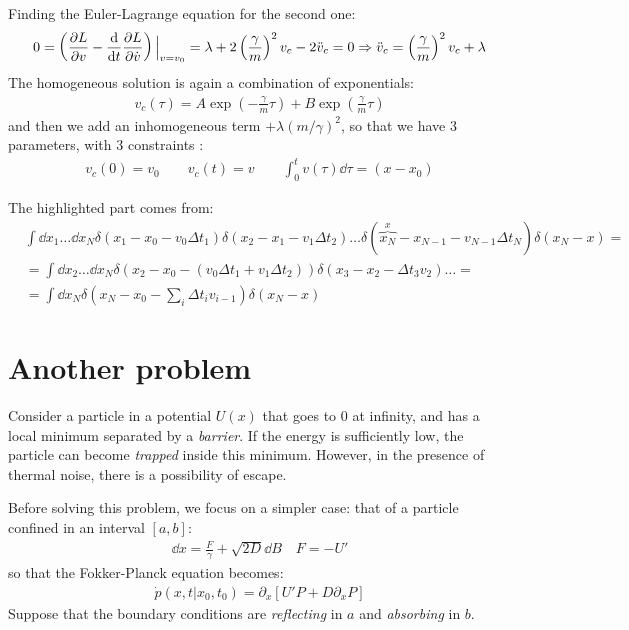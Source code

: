 \documentclass[../template.tex]{subfiles}
\begin{document}
Finding the Euler-Lagrange equation for the second one:
\begin{align*}
    0 = \left(\pdv{L}{v} - \dv{t} \pdv{L}{\dot{v}}\right)\Big|_{v = v_0} = \lambda + 2 \left(\frac{\gamma}{m} \right)^2 v_c - 2 \ddot{v}_c = 0 \Rightarrow \ddot{v}_c = \left(\frac{\gamma}{m} \right)^2 v_c + \lambda
\end{align*}
The homogeneous solution is again a combination of exponentials:
\begin{align*}
    v_c(\tau) = A \exp\left(-\frac{\gamma}{m}\tau \right) + B \exp\left(\frac{\gamma}{m} \tau \right)
\end{align*}
and then we add an inhomogeneous term $+\lambda (m/\gamma)^2$, so that we have $3$ parameters, with $3$ constraints :
\begin{align*}
    v_c(0) = v_0 \qquad v_c(t) = v\qquad \int_0^t v(\tau)\dd{\tau} = (x-x_0)
\end{align*}  

\begin{expl}
    The highlighted part comes from:
    \begin{align*}
        &\int \dd{x_1}\dots \dd{x_N} \delta(x_1 - x_0 - v_0 \Delta t_1) \delta(x_2 - x_1 - v_1 \Delta t_2) \dots \delta(\overbrace{x_N}^{x} - x_{N-1} - v_{N-1} \Delta t_N  ) \delta(x_N - x) =\\
        &= \int \dd{x}_2 \dots \dd{x}_N \delta(x_2 - x_0 - (v_0 \Delta t_1 + v_1 \Delta t_2)) \delta(x_3 - x_2 - \Delta t_3 v_2) \dots =\\
        &= \int \dd{x_N} \delta(x_N - x_0 - \sum_i \Delta t_i v_{i-1}) \delta(x_N - x)
    \end{align*}
\end{expl}

\section{Another problem}
Consider a particle in a potential $U(x)$ that goes to $0$ at infinity, and has a local minimum separated by a \textit{barrier}. If the energy is sufficiently low, the particle can become \textit{trapped} inside this minimum. However, in the presence of thermal noise, there is a possibility of escape. 

Before solving this problem, we focus on a simpler case: that of a particle confined in an interval $[a,b]$:
\begin{align*}
    \dd{x} = \frac{F}{\gamma} + \sqrt{2D} \dd{B} \quad F= -U' 
\end{align*} 
so that the Fokker-Planck equation becomes:
\begin{align*}
    \dot{p}(x,t|x_0,t_0) = \partial_x [U' P + D \partial_x P]
\end{align*}
Suppose that the boundary conditions are \textit{reflecting} in $a$ and \textit{absorbing} in $b$. 
\end{document}
